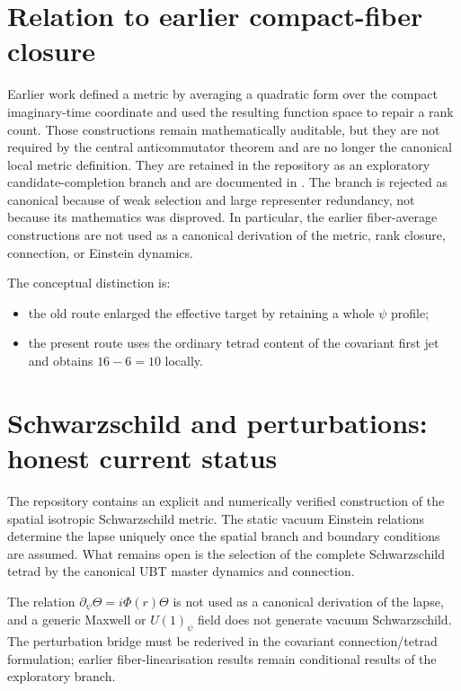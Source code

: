 \documentclass[12pt,a4paper]{article}
\theoremstyle{remark}\newtheorem{remark}[definition]{Remark}
\begin{document}
\section{Relation to earlier compact-fiber closure}
Earlier work defined a metric by averaging a quadratic form over the compact
imaginary-time coordinate and used the resulting function space to repair a
rank count.  Those constructions remain mathematically auditable, but they are
not required by the central anticommutator theorem and are no longer the
canonical local metric definition.  They are retained in the repository as an
exploratory candidate-completion branch and are documented in
.
The branch is rejected as canonical because of weak selection and large
representer redundancy, not because its mathematics was disproved.  In particular, the earlier
fiber-average constructions are not used as a canonical derivation of the
metric, rank closure, connection, or Einstein dynamics.

The conceptual distinction is:
\begin{itemize}
 \item the old route enlarged the effective target by retaining a whole
       $\psi$ profile;
 \item the present route uses the ordinary tetrad content of the covariant first
       jet and obtains $16-6=10$ locally.
\end{itemize}

\section{Schwarzschild and perturbations: honest current status}
The repository contains an explicit and numerically verified construction of
the spatial isotropic Schwarzschild metric.  The static vacuum Einstein
relations determine the lapse uniquely once the spatial branch and boundary
conditions are assumed.  What remains open is the selection of the complete
Schwarzschild tetrad by the canonical UBT master dynamics and connection.

The relation
$\partial_\psi\Theta=i\Phi(r)\Theta$ is not used as a canonical derivation of
the lapse, and a generic Maxwell or $U(1)_\psi$ field does not generate vacuum
Schwarzschild.  The perturbation bridge must be rederived in the covariant
connection/tetrad formulation; earlier fiber-linearisation results remain
conditional results of the exploratory branch.
\end{document}
